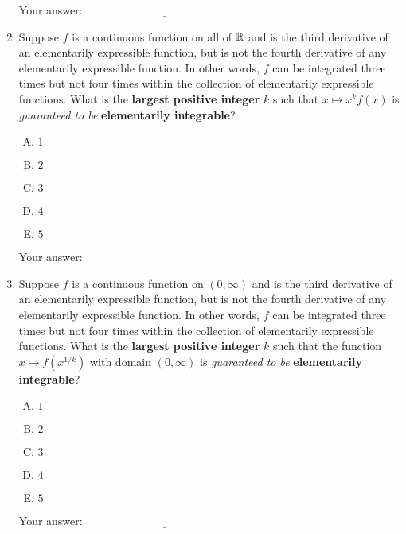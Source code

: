 \documentclass[10pt]{amsart}
\begin{document}
\begin{enumerate}
  \vspace{0.05in}
  Your answer: $\underline{\qquad\qquad\qquad\qquad\qquad\qquad\qquad}$
  \vspace{0.05in}

\item Suppose $f$ is a continuous function on all of $\mathbb{R}$ and is the
  third derivative of an elementarily expressible function, but is not
  the fourth derivative of any elementarily expressible function. In
  other words, $f$ can be integrated three times but not four times
  within the collection of elementarily expressible functions. What is
  the {\bf largest positive integer} $k$ such that $x \mapsto x^kf(x)$
  is {\em guaranteed to be} {\bf elementarily integrable}?

  \begin{enumerate}[(A)]
  \item $1$
  \item $2$
  \item $3$
  \item $4$
  \item $5$
  \end{enumerate}

  \vspace{0.05in}
  Your answer: $\underline{\qquad\qquad\qquad\qquad\qquad\qquad\qquad}$
  \vspace{0.05in}

\item Suppose $f$ is a continuous function on $(0,\infty)$ and is the
  third derivative of an elementarily expressible function, but is not
  the fourth derivative of any elementarily expressible function. In
  other words, $f$ can be integrated three times but not four times
  within the collection of elementarily expressible functions. What is
  the {\bf largest positive integer} $k$ such that the function $x
  \mapsto f(x^{1/k})$ with domain $(0,\infty)$ is {\em guaranteed to
  be} {\bf elementarily integrable}?

  \begin{enumerate}[(A)]
  \item $1$
  \item $2$
  \item $3$
  \item $4$
  \item $5$
  \end{enumerate}

  \vspace{0.05in}
  Your answer: $\underline{\qquad\qquad\qquad\qquad\qquad\qquad\qquad}$
  \vspace{0.05in}


\end{enumerate}
\end{document}

